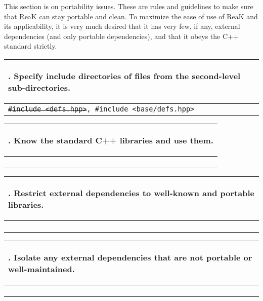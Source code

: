 \documentclass[10pt]{article}
\newcommand{\code}[1]{\color[rgb]{0.2,0.8,0.2}\texttt{#1}\color[rgb]{0,0,0} }
\newcounter {iCommandment}
\newcommand{\CorG}[5]
{
\begin{table}[H]
\begin{center}
\begin{tabular}{| p{12cm} |}
\hline
#1. #2 \\
\hline
\vspace{-0.1cm}
\parbox{12cm}{\code{#3}} \\
\vspace{-0.2cm}
#4 \\
#5 \\
\hline
\end{tabular}
\end{center}
\end{table}
}
\newcommand{\Commandment}[4]
{
\CorG{\textbf{\arabic{iCommandment}}\addtocounter{iCommandment}{1}}
{\textbf{#1}}{#2}{#3}{#4}
}
\begin{document}
This section is on portability issues. These are rules and guidelines to make sure that ReaK can stay portable 
and clean. To maximize the ease of use of ReaK and its applicability, it is very much desired that it has very 
few, if any, external dependencies (and only portable dependencies), and that it obeys the C++ standard strictly.

\Commandment
{Specify include directories of files from the second-level sub-directories.}
{\sout{\#include <defs.hpp>}, \#include <base/defs.hpp> }
{The ReaK library has a top-level source directory named ``ReaK'' and then second-level sub-directories 
like ``core'', ``ctrl'' and ``examples''. The intended inclusion path (added to the build system) are those 
second-level sub-directories, and thus, all header files that are included from a source or header file and 
that are not in the same folder as that source or header file should include the relative path from the 
relevant second-level sub-directory, e.g. the defs.hpp header file is in the ``ReaK/core/base'' folder and 
should thus be included as ``base/defs.hpp''.}
{\ }

\Commandment
{Know the standard C++ libraries and use them.}
{\ }
{The C++ standard libraries are your best bet to find useful generic constructs to implement code, know them well
and prefer using them over any kind of hand-rolled code of your own.}
{\ }

\Commandment
{Restrict external dependencies to well-known and portable libraries.}
{\ }
{The ReaK library has, currently, a single external dependency, that is, the Boost libraries which are very well-known,
respected, actively maintained and portable to any platform. This is the ideal case for an external dependency used in
ReaK. There are very few libraries that have such qualities, and this is why few external dependencies are expected in 
the future of ReaK. Any potential inclusion of an external library should be discussed extensively.}
{\ }

\Commandment
{Isolate any external dependencies that are not portable or well-maintained.}
{\ }
{The ReaK library has, currently, and has had in the past some external dependencies that are less reputable but offer 
interesting features and avoid having to re-invent the wheel (e.g. a GUI tool or image processing library or HAL). Such external
dependencies must be isolated from the rest of the library. In most cases, these external dependencies can be needed to 
implement examples and applications of the library, in which case, it is easy to restrict the use of that external library
to the application-specific code and programs, this way, the core library and its functionalities are not dependent on that 
external library. If an external library is used to implement a functionality of 
or an extension to the ReaK library, then isolate the code that uses the external library via a compilation firewall, that 
is, restrict its use to source files and do not include the external headers in their header files (a useful idiom to 
achieve this is called the ``PImpl'' idiom or ``Cheshire Cat'' idiom).}
{\ }
\end{document}
